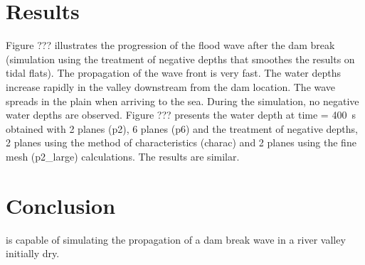 \section{Results}
%
Figure ??? illustrates the progression of the flood wave after the dam
break (simulation using the treatment of negative depths that smoothes
the results on tidal flats).
The propagation of the wave front is very fast.
The water depths increase rapidly in the valley downstream from the dam
location.
The wave spreads in the plain when arriving to the sea.
During the simulation, no negative water depths are observed.
Figure ??? presents the water depth at time = 400~s obtained with 2
planes (p2), 6 planes (p6) and the treatment of negative depths,
2 planes using the method of characteristics (charac)
and 2 planes using the fine mesh (p2\_large) calculations.
The results are similar.
%
\section{Conclusion}
%
 is capable of simulating the propagation of a dam break
wave in a river valley initially dry.
%
%
